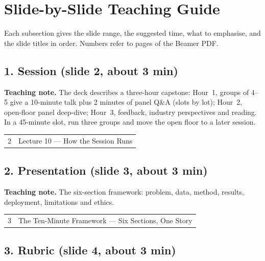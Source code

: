 \documentclass[11pt]{article}
\begin{document}
\section{Slide-by-Slide Teaching Guide}

Each subsection gives the slide range, the suggested time, what to emphasise, and the slide titles in order. Numbers refer to pages of the Beamer PDF.

\subsection{1. Session \normalfont\small\color{GreyN}(slide 2, about 3 min)}

\textbf{Teaching note.} The deck describes a three-hour capstone: Hour~1, groups of 4--5 give a 10-minute talk plus 2 minutes of panel Q\&A (slots by lot); Hour~2, open-floor panel deep-dive; Hour~3, feedback, industry perspectives and reading. In a 45-minute slot, run three groups and move the open floor to a later session.

\begin{center}\small\renewcommand{\arraystretch}{1.1}\begin{tabularx}{\textwidth}{@{}r X@{}}2 & Lecture 10 --- How the Session Runs\\\end{tabularx}\end{center}

\subsection{2. Presentation \normalfont\small\color{GreyN}(slide 3, about 3 min)}

\textbf{Teaching note.} The six-section framework: problem, data, method, results, deployment, limitations and ethics.

\begin{center}\small\renewcommand{\arraystretch}{1.1}\begin{tabularx}{\textwidth}{@{}r X@{}}3 & The Ten-Minute Framework --- Six Sections, One Story\\\end{tabularx}\end{center}

\subsection{3. Rubric \normalfont\small\color{GreyN}(slide 4, about 3 min)}
\end{document}
